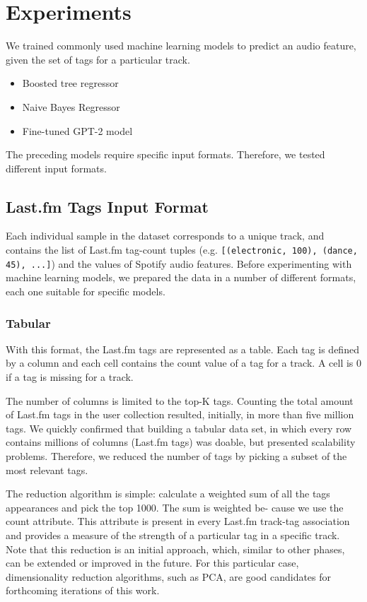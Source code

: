 \documentclass[sn-mathphys]{sn-jnl}%
\theoremstyle{thmstyleone}%
\theoremstyle{thmstyletwo}%
\theoremstyle{thmstylethree}%
\begin{document}
\section{Experiments}

We trained commonly used machine learning models to predict an audio feature, given the set of tags for a particular track.

\begin{itemize}
      \item Boosted tree regressor \cite{xgboost}
      \item Naive Bayes Regressor \cite{bayesian}
      \item Fine-tuned GPT-2 model
\end{itemize}

The preceding models require specific input formats.
Therefore, we tested different input formats.

\subsection{Last.fm Tags Input Format}

Each individual sample in the dataset corresponds to a unique track,
and contains the list of Last.fm tag-count tuples (e.g. \verb|[(electronic, 100), (dance, 45), ...]|)
and the values of Spotify audio features.
Before experimenting with machine learning models, we prepared the data in a number of different formats,
each one suitable for specific models.


\subsubsection{Tabular}
With this format, the Last.fm tags are represented as a table.
Each tag is defined by a column and each cell contains the count value of a tag for a track.
A cell is 0 if a tag is missing for a track.

The number of columns is limited to the top-K tags.
Counting the total amount of Last.fm tags in the user collection resulted, initially, in more than five million tags.
We quickly confirmed that building a tabular data set, in which every row contains millions of columns (Last.fm tags)
was doable, but presented scalability problems.
Therefore, we reduced the number of tags by picking a subset of the most relevant tags.

The reduction algorithm is simple: calculate a weighted sum of all the tags appearances and pick the top 1000.
The sum is weighted be- cause we use the count attribute.
This attribute is present in every Last.fm track-tag association and provides a measure of the strength of a particular tag in a specific track.
Note that this reduction is an initial approach, which, similar to other phases, can be extended or improved in the future. For this particular case, dimensionality reduction algorithms, such as PCA, are good candidates for forthcoming iterations of this work.
\end{document}

